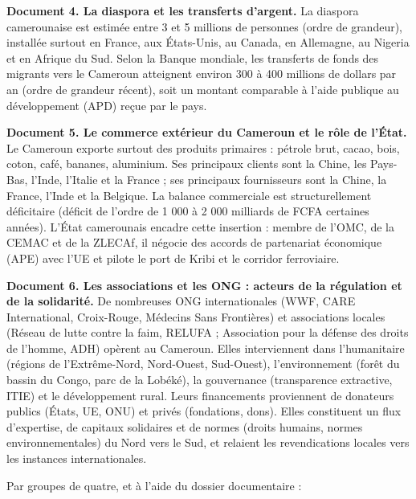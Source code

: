 \documentclass[11pt]{article}
\newcounter{popsec}
\newcounter{popsub}
\newcommand{\courssub}[1]{%
  \stepcounter{popsub}%
  \par\vspace{9pt}\noindent{\popxbold\fontsize{11.5}{13}\selectfont\color{popink}{\color{poporange}\thepopsec.\thepopsub}\hspace{6pt}#1}\par\nopagebreak\vspace{4pt}
}
\begin{document}
\textbf{Document 4. La diaspora et les transferts d'argent.} La diaspora camerounaise est estimée entre 3 et 5 millions de personnes (ordre de grandeur), installée surtout en France, aux États-Unis, au Canada, en Allemagne, au Nigeria et en Afrique du Sud. Selon la Banque mondiale, les transferts de fonds des migrants vers le Cameroun atteignent environ 300 à 400 millions de dollars par an (ordre de grandeur récent), soit un montant comparable à l'aide publique au développement (APD) reçue par le pays.

\textbf{Document 5. Le commerce extérieur du Cameroun et le rôle de l'État.} Le Cameroun exporte surtout des produits primaires : pétrole brut, cacao, bois, coton, café, bananes, aluminium. Ses principaux clients sont la Chine, les Pays-Bas, l'Inde, l'Italie et la France ; ses principaux fournisseurs sont la Chine, la France, l'Inde et la Belgique. La balance commerciale est structurellement déficitaire (déficit de l'ordre de 1 000 à 2 000 milliards de FCFA certaines années). L'État camerounais encadre cette insertion : membre de l'OMC, de la CEMAC et de la ZLECAf, il négocie des accords de partenariat économique (APE) avec l'UE et pilote le port de Kribi et le corridor ferroviaire.

\textbf{Document 6. Les associations et les ONG : acteurs de la régulation et de la solidarité.} De nombreuses ONG internationales (WWF, CARE International, Croix-Rouge, Médecins Sans Frontières) et associations locales (Réseau de lutte contre la faim, RELUFA ; Association pour la défense des droits de l'homme, ADH) opèrent au Cameroun. Elles interviennent dans l'humanitaire (régions de l'Extrême-Nord, Nord-Ouest, Sud-Ouest), l'environnement (forêt du bassin du Congo, parc de la Lobéké), la gouvernance (transparence extractive, ITIE) et le développement rural. Leurs financements proviennent de donateurs publics (États, UE, ONU) et privés (fondations, dons). Elles constituent un flux d'expertise, de capitaux solidaires et de normes (droits humains, normes environnementales) du Nord vers le Sud, et relaient les revendications locales vers les instances internationales.

\courssub{Consignes}

Par groupes de quatre, et à l'aide du dossier documentaire :
\end{document}
